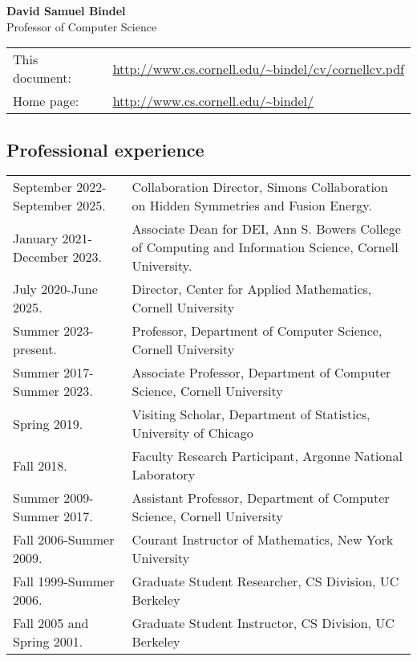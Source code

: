 \documentclass{article}
\begin{document}
\begin{center}
  {\Large \bf David Samuel Bindel} \\
  Professor of Computer Science \\[5mm]
  \begin{tabular}{ll}
  This document: & \url{http://www.cs.cornell.edu/~bindel/cv/cornellcv.pdf} \\
  Home page: & \url{http://www.cs.cornell.edu/~bindel/}
  \end{tabular}
\end{center}


\subsection*{Professional experience}

\begin{tabular}{ll}
  September 2022-September 2025.
    & Collaboration Director, Simons Collaboration on Hidden Symmetries and Fusion Energy. \\
  January 2021-December 2023.
    & Associate Dean for DEI, Ann S. Bowers College of Computing and Information Science, Cornell University. \\
  July 2020-June 2025.
    & Director, Center for Applied Mathematics, Cornell University \\
  Summer 2023-present.
    & Professor, Department of Computer Science,
      Cornell University \\
  Summer 2017-Summer 2023.
    & Associate Professor, Department of Computer Science,
      Cornell University \\
  Spring 2019. 
    & Visiting Scholar, Department of Statistics, University of Chicago \\
  Fall 2018. 
    & Faculty Research Participant, Argonne National Laboratory \\
  Summer 2009-Summer 2017.
    & Assistant Professor, Department of Computer Science,
      Cornell University \\
  Fall 2006-Summer 2009.
    & Courant Instructor of Mathematics, New York University \\
  Fall 1999-Summer 2006.
    & Graduate Student Researcher, CS Division, UC Berkeley \\
  Fall 2005 and Spring 2001.
    & Graduate Student Instructor, CS Division, UC Berkeley
\end{tabular}
\end{document}
